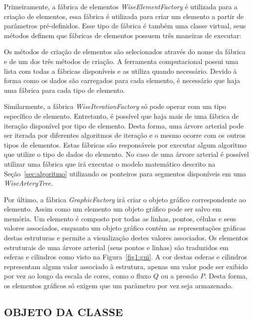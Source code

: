 Primeiramente, a fábrica de elementos \textit{WiseElementFactory} é utilizada para a criação de elementos, essa fábrica é utilizada para criar um elemento a partir de parâmetros pré-definidos. Esse tipo de fábrica é também uma classe virtual, seus métodos definem que fábricas de elementos possuem três maneiras de executar: 

Os métodos de criação de elementos são selecionados através do nome da fábrica e de um dos três métodos de criação. A ferramenta computacional possui uma lista com todas a fábricas disponíveis e as utiliza quando necessário. Devido à forma como os dados são carregados para cada elemento, é necessário que haja uma fábrica para cada tipo de elemento.

Similarmente, a fábrica \textit{WiseIterationFactory} só pode operar com um tipo específico de elemento. Entretanto, é possível que haja mais de uma fábrica de iteração disponível por tipo de elemento. Desta forma, uma árvore arterial pode ser iterada por diferentes algoritmos de iteração e o mesmo ocorre com os outros tipos de elementos. Estas fábricas são responsáveis por executar algum algoritmo que utilize o tipo de dados do elemento. No caso de uma árvore arterial é possível utilizar uma fábrica que irá executar o modelo matemático descrito na Seção~\ref{sec:algoritmo} utilizando os ponteiros para segmentos disponíveis em uma \textit{WiseArteryTree}.

Por último, a fábrica \textit{GraphicFactory} irá criar o objeto gráfico correspondente ao elemento. Assim como um elemento um objeto gráfico pode ser salvo em memória.  Um elemento é composto por todas as linhas, pontos, células e seus valores associados, enquanto um objeto gráfico contém as representações gráficas destas estruturas e permite a visualização destes valores associados. Os elementos estruturais de uma árvore arterial (seus pontos e linhas) são traduzidos em esferas e cilindros como visto na Figura~\ref{fig1:gui}. A cor destas esferas e cilindros representam algum valor associado à estrutura, apenas um valor pode ser exibido por vez ao longo da escala de cores, como o fluxo $Q$ ou a pressão $P$. Desta forma, os elementos gráficos só exigem que um parâmetro por vez seja armazenado.


\subsection{OBJETO DA CLASSE}\label{sec:objeto_inteligente}

